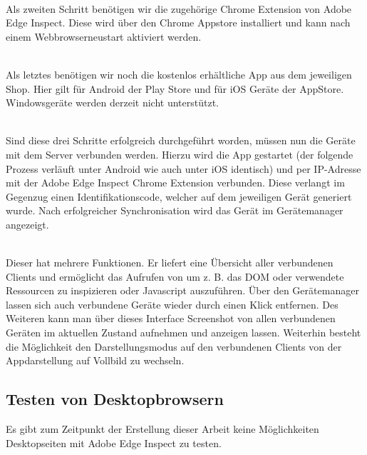 		\\Als zweiten Schritt benötigen wir die zugehörige Chrome Extension von Adobe Edge Inspect. Diese wird über den Chrome \Gls{App}store installiert und kann nach einem \Gls{Webbrowser}neustart aktiviert werden.
		
		\\Als letztes benötigen wir noch die kostenlos erhältliche \Gls{App} aus dem jeweiligen Shop. Hier gilt für Android der Play Store und für iOS Geräte der \Gls{App}Store. Windowsgeräte werden derzeit nicht unterstützt.
		
		\\Sind diese drei Schritte erfolgreich durchgeführt worden, müssen nun die Geräte mit dem Server verbunden werden. Hierzu wird die \Gls{App} gestartet (der folgende Prozess verläuft unter Android wie auch unter iOS identisch) und per IP-Adresse mit der Adobe Edge Inspect Chrome Extension verbunden. Diese verlangt im Gegenzug einen Identifikationscode, welcher auf dem jeweiligen Gerät generiert wurde. Nach erfolgreicher Synchronisation wird das Gerät im Gerätemanager angezeigt.

		\\Dieser hat mehrere Funktionen. Er liefert eine Übersicht aller verbundenen Clients und ermöglicht das Aufrufen von  um z. B. das \Gls{DOM} oder verwendete Ressourcen zu inspizieren oder \Gls{Javascript} auszuführen. Über den Gerätemanager lassen sich auch verbundene Geräte wieder durch einen Klick entfernen. Des Weiteren kann man über dieses Interface Screenshot von allen verbundenen Geräten im aktuellen Zustand aufnehmen und anzeigen lassen. Weiterhin besteht die Möglichkeit den Darstellungsmodus auf den verbundenen Clients von der \Gls{App}darstellung auf Vollbild zu wechseln.
		
		\subsection{Testen von Desktopbrowsern}
		Es gibt zum Zeitpunkt der Erstellung dieser Arbeit keine Möglichkeiten Desktopseiten mit Adobe Edge Inspect zu testen.
		
